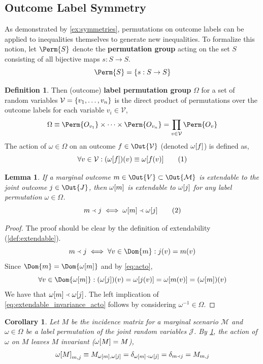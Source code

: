 \documentclass[aps, 10pt, english, twoside, pra, nofootinbib, longbibliography]{revtex4-1}
\theoremstyle{plain}
\newtheorem{lemma}[theorem]{Lemma}
\newtheorem{corollary}[theorem]{Corollary}
\theoremstyle{definition}
\newtheorem{definition}[theorem]{Definition}
\theoremstyle{remark}
\newcommand{\ext}{\mathrel{\Yleft}}
\newcommand{\geo}{\omega}
\newcommand{\go}{\Omega}
\newcommand{\mscenario}{\mathcal{M}}
\newcommand{\jointvar}{\mathcal{J}}
\newcommand{\term}[1]{\textcolor{Mahogany}{\textbf{#1}}}
\begin{document}
    \subsection{Outcome Label Symmetry}
    As demonstrated by \cref{ex:symmetries}, permutations on outcome labels can be applied to inequalities themselves to generate new inequalities. To formalize this notion, let $\Perm{S}$ denote the \term{permutation group} acting on the set $S$ consisting of all bijective maps $s : S \to S$.
    \[ \Perm{S} = \bc{s : S \to S} \]
    \begin{definition}
        Then (outcome) \term{label permutation group} $\go$ for a set of random variables $\mathcal{V} = \bc{v_1, \ldots, v_n}$ is the direct product of permutations over the outcome labels for each variable $v_i \in \mathcal{V}$,
        \[ \go \defined \Perm{O_{v_1}} \times \cdots \times \Perm{O_{v_n}} = \prod_{v \in \mathcal{V}} \Perm{O_{v}} \]
        The action of $\geo \in \go$ on an outcome $f \in \Out{\mathcal{V}}$ (denoted $\geo\bs{f}$) is defined as,
        \[ \forall v \in \mathcal{V} : \br{\geo\bs{f}}\br{v} \defined \geo\bs{f\br{v}} \eq \label{eq:acto}\]
    \end{definition}
    \begin{lemma}
        \label{lem:extendable_invariance_acto}
        If a marginal outcome $m \in \Out{V} \subset \Out{\mscenario}$ is extendable to the joint outcome $j \in \Out{J}$, then $\geo\bs{m}$ is extendable to $\geo\bs{j}$ for any label permutation $\geo \in \go$.
        \[ m \ext j \iff \geo\bs{m} \ext \geo\bs{j} \eq \label{eq:extendable_invariance_acto}\]
    \end{lemma}
    \begin{proof}
        The proof should be clear by the definition of extendability (\cref{def:extendable}).
        \[ m \ext j \iff \forall v \in \Dom{m} : j\br{v} = m\br{v} \]
        Since $\Dom{m} = \Dom{\geo\bs{m}}$ and by \cref{eq:acto},
        \[ \forall v \in \Dom{\geo\bs{m}}: \br{\geo\bs{j}}\br{v} = \geo\bs{j\br{v}} = \geo\bs{m\br{v}} = \br{\geo\bs{m}}\br{v} \]
        We have that $\geo\bs{m} \ext \geo\bs{j}$. The left implication of \cref{eq:extendable_invariance_acto} follows by considering $\geo^{-1} \in \go$.
    \end{proof}
    \begin{corollary}
        \label{coll:incidence_invariance}
        Let $M$ be the incidence matrix for a marginal scenario $\mscenario$ and $\geo \in \go$ be a label permutation of the joint random variables $\jointvar$. By \cref{lem:extendable_invariance_acto}, the action of $\geo$ on $M$ leaves $M$ invariant ($\geo\bs{M} = M$),
        \[ \geo\bs{M}_{m,j} \defined M_{\geo\bs{m},\geo\bs{j}} = \de_{\geo\bs{m} \ext \geo\bs{j}} = \de_{m \ext j} = M_{m,j} \]
    \end{corollary}
\end{document}
